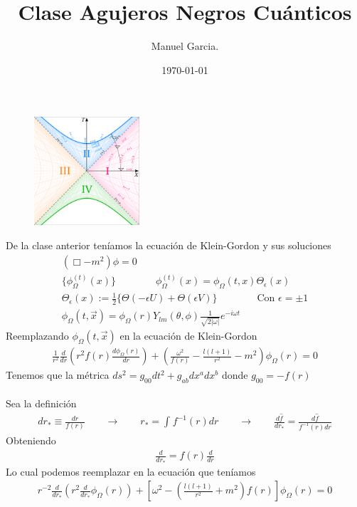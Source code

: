 \documentclass{article}
\title{Clase Agujeros Negros Cuánticos}
\author{Manuel Garcia.}
\date{\today}
\begin{document}
\maketitle

\section{}
\begin{figure}[H]
  \begin{center}
    \includegraphics[width=0.35\textwidth]{kruskal.png}
  \end{center}
\end{figure}


De la clase anterior teníamos la ecuación de Klein-Gordon y sus soluciones 
\begin{gather*}
  (\Box - m^2 ) \phi = 0 \\
  \{\phi_\Omega ^ {(t) }(x) \} \qquad \qquad \phi_\Omega ^ {(t)}(x) = \phi _\Omega (t,x) \Theta_\epsilon(x) \\
  \Theta_\epsilon(x) := \frac{1}{2}\{\Theta(-\epsilon U) + \Theta(\epsilon V  )\} \qquad \qquad \text{Con }\epsilon = \pm 1  \\
  \phi_\Omega(t,\vec x) = \phi_\Omega (r) Y _{lm } (\theta,\phi) \frac{1}{\sqrt{2 \left|\omega\right|} } e ^ {- i \omega t }
\end{gather*}
Reemplazando $ \phi_\Omega (t,\vec x)  $ en la ecuación de Klein-Gordon 
\begin{gather*}
  \frac{1}{r^2 } \frac{d  }{d r } \left(r^2 f\left(r\right) \frac{d \phi_\Omega(r)  }{d r }\right) + \left(\frac{\omega^2 }{f(r) } - \frac{l(l+1) }{r^2 } - m^2 \right)\phi_\Omega(r) = 0  
\end{gather*}
Tenemos que la métrica $ ds^2 = g _{00 }  dt^2 + g _{ab }  dx^a dx^b  $ donde $ g _{00 } = - f(r)  $\\ 
\\
Sea la definición 
\begin{gather*}
  dr_* \equiv \frac{dr }{f(r) } \qquad   \rightarrow \qquad r_* = \displaystyle\int_{}^{} f^{-1} (r) dr \qquad\rightarrow \qquad\frac{d \hat f  }{d r_* } = \frac{d \hat f  }{f ^ {-1 }(r) dr}
\end{gather*}
Obteniendo 
\begin{gather*}
  \frac{d  }{d r_* } = f(r) \frac{d  }{d r } 
\end{gather*}
Lo cual podemos reemplazar en la ecuación que teníamos 
\begin{gather*}
  r ^ {-2 } \frac{d  }{d r_* } \left(r^2 \frac{d  }{d r_* } \phi_\Omega (r) \right) + \left[\omega^2 - \left(\frac{l(l+1 )}{r^2 } + m^2 \right)f(r) \right] \phi_\Omega (r) = 0  
\end{gather*}
\end{document}

